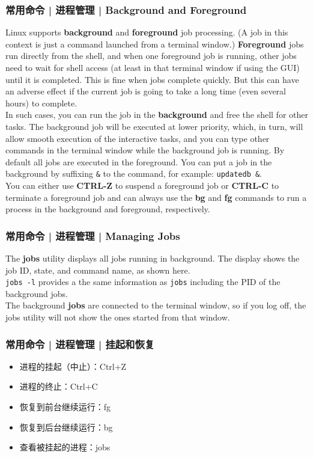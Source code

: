 \begin{frame}[fragile]
  \frametitle{常用命令 | 进程管理 | Background and Foreground}
  {\footnotesize
  Linux supports \textbf{background} and \textbf{foreground} job processing. (A job in this context is just a command launched from a terminal window.) \textbf{Foreground} jobs run directly from the shell, and when one foreground job is running, other jobs need to wait for shell access (at least in that terminal window if using the GUI) until it is completed. This is fine when jobs complete quickly. But this can have an adverse effect if the current job is going to take a long time (even several hours) to complete.\\
  \vspace{0.2cm}
  In such cases, you can run the job in the \textbf{background} and free the shell for other tasks. The background job will be executed at lower priority, which, in turn, will allow smooth execution of the interactive tasks, and you can type other commands in the terminal window while the background job is running. By default all jobs are executed in the foreground. You can put a job in the background by suffixing \verb|&| to the command, for example: \verb|updatedb &|.\\
  \vspace{0.2cm}
  You can either use \textbf{CTRL-Z} to suspend a foreground job or \textbf{CTRL-C} to terminate a foreground job and can always use the \textbf{bg} and \textbf{fg} commands to run a process in the background and foreground, respectively.\\
  } 
\end{frame}

\begin{frame}[fragile]
  \frametitle{常用命令 | 进程管理 | Managing Jobs}
  The \textbf{jobs} utility displays all jobs running in background. The display shows the job ID, state, and command name, as shown here.\\
  \vspace{0.2cm}
  \verb|jobs -l| provides a the same information as \verb|jobs| including the PID of the background jobs.\\
  \vspace{0.2cm}
  The background \textbf{jobs} are connected to the terminal window, so if you log off, the jobs utility will not show the ones started from that window.
\end{frame}

\begin{frame}
  \frametitle{常用命令 | 进程管理 | \alert{挂起和恢复}}
  \begin{itemize}
    \item 进程的挂起（中止）：Ctrl+Z
    \item 进程的终止：Ctrl+C
    \item 恢复到前台继续运行：fg
    \item 恢复到后台继续运行：bg
    \item 查看被挂起的进程：jobs
  \end{itemize}
\end{frame}

